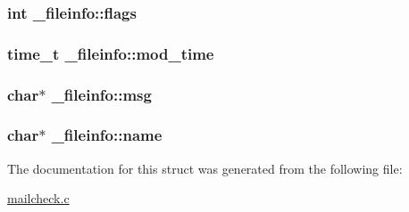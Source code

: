 \subsubsection[{\texorpdfstring{flags}{flags}}]{\setlength{\rightskip}{0pt plus 5cm}int \+\_\+fileinfo\+::flags}\hypertarget{struct__fileinfo_ace325912d8b1e2db21732d0bdeae6e95}{}\label{struct__fileinfo_ace325912d8b1e2db21732d0bdeae6e95}
\subsubsection[{\texorpdfstring{mod\+\_\+time}{mod_time}}]{\setlength{\rightskip}{0pt plus 5cm}time\+\_\+t \+\_\+fileinfo\+::mod\+\_\+time}\hypertarget{struct__fileinfo_a17b9194f9b657cc80abac1aa26a42661}{}\label{struct__fileinfo_a17b9194f9b657cc80abac1aa26a42661}
\subsubsection[{\texorpdfstring{msg}{msg}}]{\setlength{\rightskip}{0pt plus 5cm}char$\ast$ \+\_\+fileinfo\+::msg}\hypertarget{struct__fileinfo_a12b0aa6954d5dacf2ee0e3209f7873af}{}\label{struct__fileinfo_a12b0aa6954d5dacf2ee0e3209f7873af}
\subsubsection[{\texorpdfstring{name}{name}}]{\setlength{\rightskip}{0pt plus 5cm}char$\ast$ \+\_\+fileinfo\+::name}\hypertarget{struct__fileinfo_a203585c0c73ab6553ffaf6e0c8b8ee1c}{}\label{struct__fileinfo_a203585c0c73ab6553ffaf6e0c8b8ee1c}


The documentation for this struct was generated from the following file\+:\begin{DoxyCompactItemize}
\item 
\hyperlink{mailcheck_8c}{mailcheck.\+c}\end{DoxyCompactItemize}
